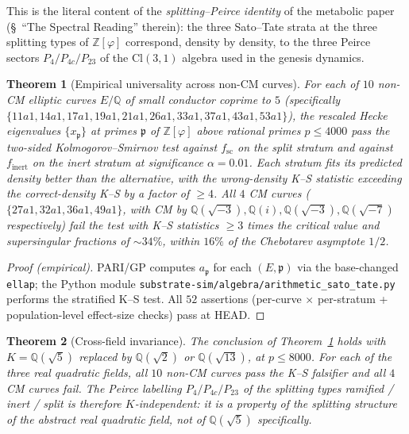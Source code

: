 \documentclass[11pt,a4paper]{article}
\theoremstyle{plain}
\newtheorem{theorem}{Theorem}[section]
\theoremstyle{definition}
\theoremstyle{remark}
\numberwithin{equation}{section}
\providecommand{\Zp}{\ensuremath{\mathbb{Z}[\varphi]}}
\providecommand{\Qp}{\ensuremath{\mathbb{Q}(\sqrt{5})}}
\begin{document}
This is the literal content of the \emph{splitting--Peirce identity}
of the metabolic paper (\S~``The Spectral Reading'' therein):
the three Sato--Tate strata at the three splitting types of
$\Zp$ correspond, density by density, to the three Peirce sectors
$P_4 / P_{4c} / P_{23}$ of the $\mathrm{Cl}(3,1)$ algebra used in the
genesis dynamics.

\begin{theorem}[Empirical universality across non-CM curves]
\label{thm:universality-empirical}
For each of $10$ non-CM elliptic curves $E/\mathbb{Q}$ of small conductor coprime to $5$
(specifically $\{11a1,14a1,17a1,19a1,21a1,26a1,33a1,37a1,43a1,53a1\}$),
the rescaled Hecke eigenvalues $\{x_{\mathfrak p}\}$ at primes
$\mathfrak p$ of $\Zp$ above rational primes $p\le 4000$ pass the
two-sided Kolmogorov--Smirnov test against $f_{\mathrm{sc}}$ on the
split stratum and against $f_{\mathrm{inert}}$ on the inert stratum at
significance $\alpha=0.01$.  Each stratum fits its predicted density
\emph{better} than the alternative, with the wrong-density K--S
statistic exceeding the correct-density K--S by a factor of
$\ge 4$.  All $4$ CM curves
($\{27a1,32a1,36a1,49a1\}$, with CM by
$\mathbb{Q}(\sqrt{-3}),\mathbb{Q}(i),\mathbb{Q}(\sqrt{-3}),\mathbb{Q}(\sqrt{-7})$
respectively) fail the test with K--S statistics $\ge 3$ times the
critical value and supersingular fractions of $\sim 34\%$, within
$16\%$ of the Chebotarev asymptote $1/2$.
\end{theorem}

\begin{proof}[Proof (empirical)]
PARI/GP computes $a_{\mathfrak p}$ for each $(E,\mathfrak p)$ via the
base-changed \texttt{ellap}; the Python module
\texttt{substrate-sim/algebra/arithmetic\_sato\_tate.py} performs the
stratified K--S test.  All $52$ assertions (per-curve $\times$
per-stratum + population-level effect-size checks) pass at HEAD.
\end{proof}

\begin{theorem}[Cross-field invariance]
\label{thm:cross-field-empirical}
The conclusion of Theorem~\ref{thm:universality-empirical} holds with
$K=\Qp$ replaced by $\mathbb{Q}(\sqrt 2)$ or $\mathbb{Q}(\sqrt{13})$, at $p\le 8000$.
For each of the three real quadratic fields, all $10$ non-CM curves
pass the K--S falsifier and all $4$ CM curves fail.  The Peirce
labelling $P_4 / P_{4c} / P_{23}$ of the splitting types
ramified / inert / split is therefore $K$-independent: it is a
property of the splitting structure of the abstract real quadratic
field, not of $\Qp$ specifically.
\end{theorem}
\end{document}
